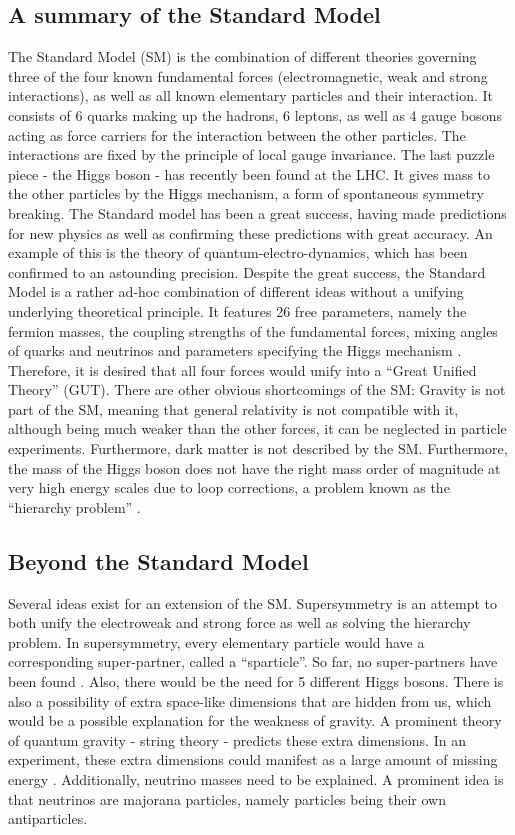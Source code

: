 \documentclass[twoside,        %
               BCOR12mm,       %
               ngerman,english, %
               fleqn,headsepline=false,footsepline=false
              ]{Vorlage/MFPREPORT}
\begin{document}
\subsection{A summary of the Standard Model}
The Standard Model (SM) is the combination of different theories governing
three of the four known fundamental forces (electromagnetic, weak and strong
interactions), as well as all known elementary particles and their interaction. 
It consists of 6 quarks making up the hadrons, 6 leptons, as well as 4 gauge
bosons acting as force carriers for the interaction between the other
particles. The interactions are fixed by the principle of local gauge
invariance. The last puzzle piece - the Higgs boson - has recently been found at
the LHC. It gives mass to the other particles by the Higgs mechanism, a form of
spontaneous symmetry breaking. 
The Standard model has been a great success, having made predictions for new
physics as well as confirming these predictions with great accuracy. An example
of this is the theory of quantum-electro-dynamics, which has been confirmed to
an astounding precision.
Despite the great success, the Standard Model is a rather ad-hoc combination of
different ideas without a unifying underlying theoretical principle. It
features 26 free parameters, namely the fermion masses, the coupling strengths
of the fundamental forces, mixing angles of quarks and neutrinos and parameters
specifying the Higgs mechanism \cite[p.]{thomson}. Therefore, it is
desired that all four forces would unify into a ``Great Unified Theory'' (GUT).
There are other obvious shortcomings of the SM: Gravity is not
part of the SM, meaning that general relativity is not compatible with it,
although being much weaker than the other forces, it can be neglected in
particle experiments.
Furthermore, dark matter is not described by the SM. Furthermore, the
mass of the Higgs boson does not have the right mass order of magnitude at very
high energy scales due to loop corrections, a problem known as the ``hierarchy
problem'' \cite[p.]{thomson}.

\subsection{Beyond the Standard Model}
Several ideas exist for an extension of the SM. Supersymmetry is an attempt to
both unify the electroweak and strong force as well as solving the hierarchy
problem. In supersymmetry, every elementary particle would have a corresponding
super-partner, called a ``sparticle''. So far, no super-partners have been
found \cite{thomson}. Also, there would be the need for 5 different Higgs
bosons. There is also a possibility of extra space-like dimensions that are
hidden from us, which would be a possible explanation for the weakness of
gravity. A prominent theory of quantum gravity - string theory - predicts these
extra dimensions. In an experiment, these extra dimensions could manifest as a
large amount of missing energy \cite{zwiebach2004first}. 
Additionally, neutrino masses need to be explained. A prominent idea is that
neutrinos are majorana particles, namely particles being their own
antiparticles.
\end{document}
